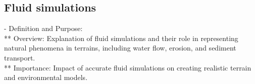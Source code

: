 
\subsection{Fluid simulations}
- Definition and Purpose: \\
** Overview: Explanation of fluid simulations and their role in representing natural phenomena in terrains, including water flow, erosion, and sediment transport. \\
** Importance: Impact of accurate fluid simulations on creating realistic terrain and environmental models.\\
